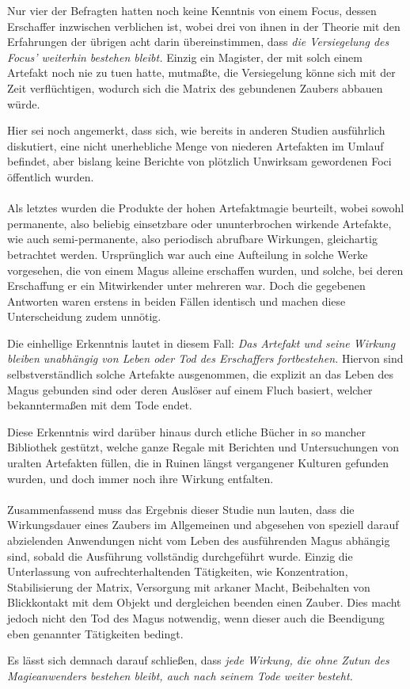 \documentclass[a5paper,8pt]{book}
\begin{document}
\begin{multicols}{2}
Nur vier der Befragten hatten noch keine Kenntnis von einem Focus, dessen Erschaffer
inzwischen verblichen ist, wobei drei von ihnen in der Theorie mit den Erfahrungen der
übrigen acht darin übereinstimmen, dass \emph{die Versiegelung des Focus' weiterhin
bestehen bleibt.} Einzig ein Magister, der mit solch einem Artefakt noch nie zu tuen
hatte, mutmaßte, die Versiegelung könne sich mit der Zeit verflüchtigen, wodurch sich die
Matrix des gebundenen Zaubers abbauen würde.

Hier sei noch angemerkt, dass sich, wie bereits in anderen Studien ausführlich
diskutiert, eine nicht unerhebliche Menge von niederen Artefakten im Umlauf befindet,
aber bislang keine Berichte von plötzlich Unwirksam gewordenen Foci öffentlich wurden.\\
\\
Als letztes wurden die Produkte der hohen Artefaktmagie beurteilt, wobei sowohl
permanente, also beliebig einsetzbare oder ununterbrochen wirkende Artefakte, wie auch
semi-permanente, also periodisch abrufbare Wirkungen, gleichartig betrachtet werden.
Ursprünglich war auch eine Aufteilung in solche Werke vorgesehen, die von einem Magus
alleine erschaffen wurden, und solche, bei deren Erschaffung er ein Mitwirkender unter
mehreren war. Doch die gegebenen Antworten waren erstens in beiden Fällen identisch und
machen diese Unterscheidung zudem unnötig.

Die einhellige Erkenntnis lautet in diesem Fall: \emph{Das Artefakt und seine Wirkung
bleiben unabhängig von Leben oder Tod des Erschaffers fortbestehen.} Hiervon sind
selbstverständlich solche Artefakte ausgenommen, die explizit an das Leben des Magus
gebunden sind oder deren Auslöser auf einem Fluch basiert, welcher bekanntermaßen mit dem
Tode endet.

Diese Erkenntnis wird darüber hinaus durch etliche Bücher in so mancher Bibliothek
gestützt, welche ganze Regale mit Berichten und Untersuchungen von uralten Artefakten
füllen, die in Ruinen längst vergangener Kulturen gefunden wurden, und doch immer noch
ihre Wirkung entfalten.\\
\\
Zusammenfassend muss das Ergebnis dieser Studie nun lauten, dass die Wirkungsdauer eines
Zaubers im Allgemeinen und abgesehen von speziell darauf abzielenden Anwendungen nicht
vom Leben des ausführenden Magus abhängig sind, sobald die Ausführung vollständig
durchgeführt wurde. Einzig die Unterlassung von aufrechterhaltenden Tätigkeiten, wie
Konzentration, Stabilisierung der Matrix, Versorgung mit arkaner Macht, Beibehalten von
Blickkontakt mit dem Objekt und dergleichen beenden einen Zauber. Dies macht jedoch nicht
den Tod des Magus notwendig, wenn dieser auch die Beendigung eben genannter Tätigkeiten
bedingt.

Es lässt sich demnach darauf schließen, dass \emph{jede Wirkung, die ohne Zutun des
Magieanwenders bestehen bleibt, auch nach seinem Tode weiter besteht.}
\end{multicols}
\end{document}
